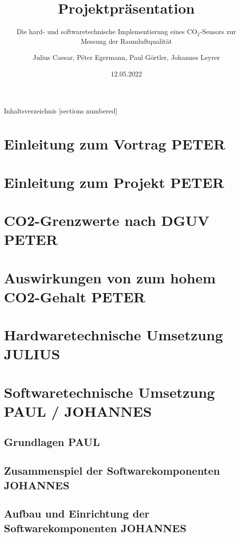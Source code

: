 \documentclass[10pt,ngerman]{beamer}
\title{Projektpräsentation}
\date{12.05.2022}
\author{Julius Caesar, Péter Egermann, Paul Görtler, Johannes Leyrer}
\institute{BSZ für Elektrotechnik Dresden -- IT20/2}
\subtitle{Die hard- und softwaretechnische Implementierung eines CO$_2$-Sensors zur Messung der Raumluftqualität}
\begin{document}
\maketitle

\begin{frame}{Inhaltsverzeichnis}
  [sections numbered]
  \tableofcontents[hideallsubsections]
\end{frame}

\section{Einleitung zum Vortrag PETER}

\section{Einleitung zum Projekt PETER}

\section{CO2-Grenzwerte nach DGUV PETER}

\section{Auswirkungen von zum hohem CO2-Gehalt PETER}

\section{Hardwaretechnische Umsetzung JULIUS}

\section{Softwaretechnische Umsetzung PAUL / JOHANNES}

\subsection{Grundlagen PAUL}

\subsection{Zusammenspiel der Softwarekomponenten JOHANNES}

\subsection{Aufbau und Einrichtung der Softwarekomponenten JOHANNES}
\end{document}
